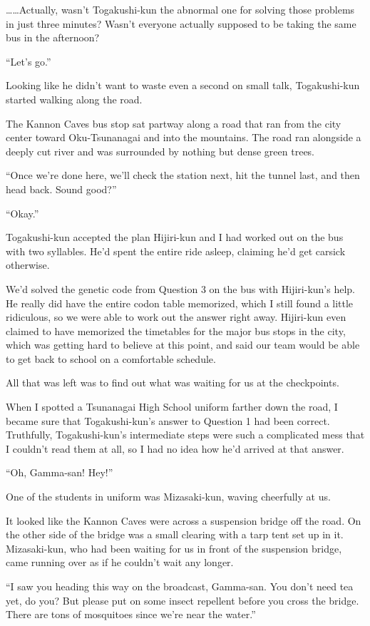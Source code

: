 \documentclass[
    a4paper,
    12pt,
    twoside,
    openany,
    UTF8,
    fontset=windows
]{ctexbook}
\begin{document}
\dots\dots Actually, wasn't Togakushi-kun the abnormal one for solving those problems in just three minutes? Wasn't everyone actually supposed to be taking the same bus in the afternoon?

``Let's go.''

Looking like he didn't want to waste even a second on small talk, Togakushi-kun started walking along the road.

The Kannon Caves bus stop sat partway along a road that ran from the city center toward Oku-Tsunanagai and into the mountains. The road ran alongside a deeply cut river and was surrounded by nothing but dense green trees.

``Once we're done here, we'll check the station next, hit the tunnel last, and then head back. Sound good?''

``Okay.''

Togakushi-kun accepted the plan Hijiri-kun and I had worked out on the bus with two syllables. He'd spent the entire ride asleep, claiming he'd get carsick otherwise.

We'd solved the genetic code from Question 3 on the bus with Hijiri-kun's help. He really did have the entire codon table memorized, which I still found a little ridiculous, so we were able to work out the answer right away. Hijiri-kun even claimed to have memorized the timetables for the major bus stops in the city, which was getting hard to believe at this point, and said our team would be able to get back to school on a comfortable schedule.

All that was left was to find out what was waiting for us at the checkpoints.

When I spotted a Tsunanagai High School uniform farther down the road, I became sure that Togakushi-kun's answer to Question 1 had been correct. Truthfully, Togakushi-kun's intermediate steps were such a complicated mess that I couldn't read them at all, so I had no idea how he'd arrived at that answer.

``Oh, Gamma-san! Hey!''

One of the students in uniform was Mizasaki-kun, waving cheerfully at us.

It looked like the Kannon Caves were across a suspension bridge off the road. On the other side of the bridge was a small clearing with a tarp tent set up in it. Mizasaki-kun, who had been waiting for us in front of the suspension bridge, came running over as if he couldn't wait any longer.

``I saw you heading this way on the broadcast, Gamma-san. You don't need tea yet, do you? But please put on some insect repellent before you cross the bridge. There are tons of mosquitoes since we're near the water.''
\end{document}
